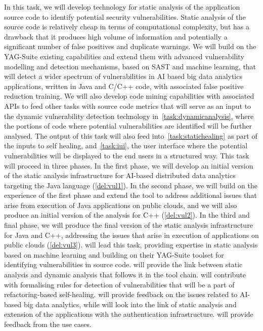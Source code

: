 \begin{Workpackage}{\thewpno}
\begin{Task}
\TaskResults{%
\ref{del:vul1},
\ref{del:vul2},
\ref{del:vul3}
}
\TaskHeader{}
In this task, we will develop technology for static analysis of the application source code to identify potential security vulnerabilities. Static analysis of the source code is relatively cheap in terms of computational complexity, but has a drawback that it produces high volume of information and potentially a significant number of false positives and duplicate warnings. %
We will build on the YAG-Suite existing capabilities and extend them with advanced vulnerability modelling and detection mechanisms, based on SAST and machine learning, that will detect a wider spectrum of vulnerabilities in AI based big data analytics applications, written in Java and C/C++ code, with associated false positive reduction training. We will also develop code mining capabilities with associated APIs to feed other tasks with source code metrics that will serve as an input to the dynamic vulnerability detection technology in~\ref{task:dynamicanalysis}, where the portions of code where potential vulnerabilities are identified will be further analysed. The output of this task will also feed into~\ref{task:statichealing} as part of the inputs to self healing, and~\ref{task:iui}, the user interface where the potential vulnerabilities will be displayed to the end users in a structured way. This task will proceed in three phases. In the first phase, we will develop an initial version of the static analysis infrastructure for AI-based distributed data analytics targeting the Java language (\ref{del:vul1}). In the second phase, we will build on the experience of the first phase and extend the tool to address additional issues that arise from execution of Java applications on public clouds, and we will also produce an initial version of the analysis for C++ (\ref{del:vul2}). \taskbreak In the third and final phase, we will produce the final version of the static analysis infrastructure for Java and C++, addressing the issues that arise in execution of applications on public clouds (\ref{del:vul3}). \YAGshort{} will lead this task, providing expertise in static analysis based on machine learning and building on their YAG-Suite toolset for identifying vulnerabilities in source code. \IBMshort{} will provide the link between static analysis and dynamic analysis that follows it in the \TheProject{} tool chain. \SAshort{} will contribute with formalising rules for detection of vulnerabilities that will be a part of refactoring-based self-healing. \UODshort{} will provide feedback on the issues related to AI-based big data analytics, while \COGNIshort{} will look into the link of static analysis and extension of the applications with the authentication infrastructure. \SOPRAshort{} will provide feedback from the use cases.



\end{Task}
\end{Workpackage}
